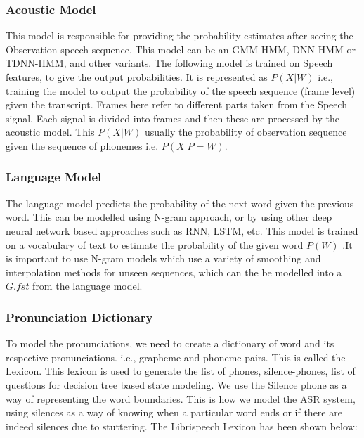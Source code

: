 \documentclass[letterpaper,12pt]{article}
\begin{document}
\pagebreak

\subsubsection{Acoustic Model}
This model is responsible for providing the probability estimates after seeing the 
Observation speech sequence. This model can be an GMM-HMM, DNN-HMM or 
TDNN-HMM, and other variants. The following model is trained on Speech features, to 
give the output probabilities. It is represented as $P(X|W)$ i.e., training the model to output
the probability of the speech sequence (frame level) given the transcript. Frames here refer 
to different parts taken from the Speech signal. Each signal is divided into frames and then 
these are processed by the acoustic model. This $P(X|W)$ usually the probability of 
observation sequence given the sequence of phonemes i.e. $P(X|P=W)$.



\subsubsection{Language Model}

The language model predicts the probability of the next word given the previous word. 
This can be modelled using N-gram approach, or by using other deep neural network based approaches such as RNN, LSTM, etc. This model is trained on a vocabulary of text 
to estimate the probability of the given word $P(W)$ .It is important to use N-gram models 
which use a variety of smoothing and interpolation methods for unseen sequences, which can the be modelled into a $G.fst$ from the language model.


\subsubsection{Pronunciation Dictionary}
To model the pronunciations, we need to create a dictionary of word and its respective 
pronunciations. i.e., grapheme and phoneme pairs. This is called the Lexicon. This lexicon 
is used to generate the list of phones, silence-phones, list of questions for decision tree based state modeling. We use the Silence phone as a way of representing the word 
boundaries. This is how we model the ASR system, using silences as a way of knowing 
when a particular word ends or if there are indeed silences due to stuttering. The
Librispeech Lexicon has been shown below:

\pagebreak
\end{document}
